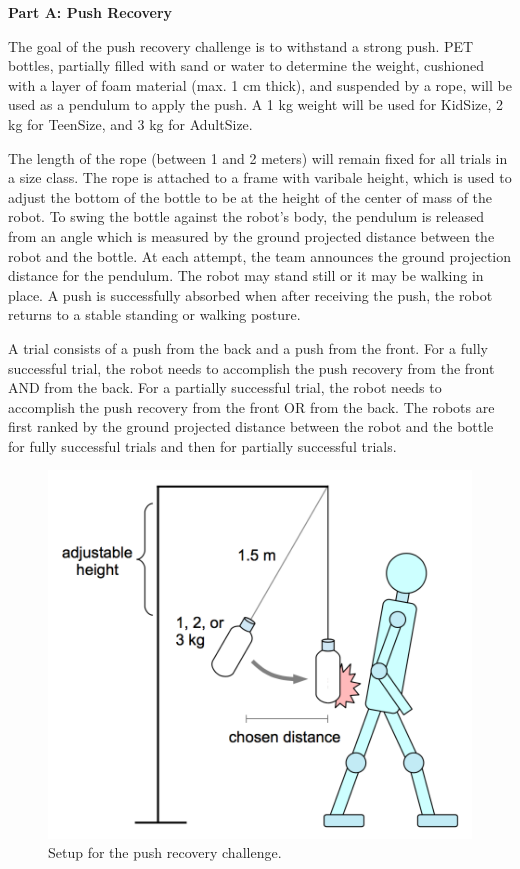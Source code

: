 \clearpage
\sffamily
{\bfseries\color[rgb]{0.4,0.4,0.4}
Part A: Push Recovery }

\bigskip

The goal of the push recovery challenge is to withstand a strong push. PET bottles, partially filled with sand or water to determine the weight, cushioned with a layer of foam material (max. 1 cm thick), and suspended by a rope, will be used as a pendulum to apply the push. A 1 kg weight will be used for KidSize, 2 kg for TeenSize, and 3 kg for AdultSize. 

The length of the rope (between 1 and 2 meters) will remain fixed for all trials in a size class. The rope is attached to a frame with varibale height, which is used to adjust the bottom of the bottle to be at the height of the center of mass of the robot. To swing the bottle against the robot's body, the pendulum is released from an angle which is measured by the ground projected distance between the robot and the bottle. At each attempt, the team announces the ground projection distance for the pendulum. The robot may stand still or it may be walking in place. A push is successfully absorbed when after receiving the push, the robot returns to a stable standing or walking posture. 

A trial consists of a push from the back and a push from the front. For a fully successful trial, the robot needs to accomplish the push recovery from the front AND from the back. For a partially successful trial, the robot needs to accomplish the
push recovery from the front OR from the back. The robots are first ranked by the ground projected distance between the robot and the bottle for fully successful trials and then for partially successful trials.

\begin{figure}[h]
\begin{center}
\includegraphics[scale=1.0]{img/push_recovery.png}
\caption{Setup for the push recovery challenge. }
\end{center}
\end{figure}